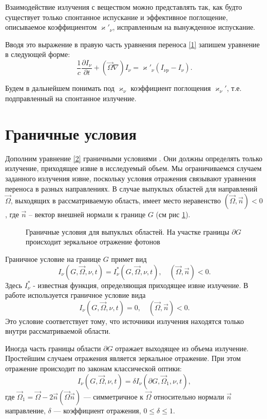 Взаимодействие излучения с веществом можно представлять так, как будто существует только спонтанное испускание и эффективное поглощение, описываемое коэффициентом $\varkappa'_{\nu}$, исправленным на вынужденное испускание. 

Вводя это выражение в правую часть уравнения переноса \eqref{1} запишем уравнение в следующей форме:
\begin {equation}
\frac{1}{c}\frac{\partial I_{\nu}}{\partial t} + (\vec\Omega \nabla) I_{\nu} = \varkappa'_{\nu} (I_{\nu p} - I_{\nu}).
\label{2}
\end {equation}

Будем в дальнейшем понимать под $\varkappa_\nu$ коэффициент поглощения $\varkappa_\nu'$, т.е. подправленный на спонтанное излучение.
\section {Граничные условия}
Дополним уравнение \eqref{2} граничными условиями \cite{chetv_1985}. Они должны определять только излучение, приходящее извне в исследуемый объем. Мы ограничиваемся случаем заданного излучения извне, поскольку условия отражения связывают уравнения переноса в разных направлениях. В случае выпуклых областей для направлений $\vec\Omega$, выходящих в рассматриваемую область, имеет место неравенство $(\vec\Omega, \vec n) < 0$, где $\vec n$ -- вектор внешней нормали к границе $G$ (см рис \ref{fig:6}).
\begin{figure}[ht!]
	\caption{Граничные условия для выпуклых областей. На участке границы $\partial G$ происходит зеркальное отражение фотонов}
	\label{fig:6}
\end{figure}

Граничное условие на границе $G$ примет вид
\begin {equation}
I_\nu (G, \vec\Omega, \nu, t) = I_\nu^*(G, \vec\Omega, \nu, t), \quad (\vec\Omega, \vec n) < 0.
\end {equation}
Здесь $I_\nu^*$ - известная функция, определяющая приходящее извне излучение. В работе используется граничное условие вида
\begin {equation}
I_\nu (G, \vec\Omega, \nu, t) = 0, \quad (\vec\Omega, \vec n) < 0.
\end {equation}
Это условие соответствует тому, что источники излучения находятся только внутри рассматриваемой области.

Иногда часть границы области $\partial G$ отражает выходящее из объема излучение. Простейшим случаем отражения является зеркальное отражение. При этом отражение происходит по законам классической оптики:
\begin {equation}
I_\nu (G, \vec\Omega, \nu, t) = \delta I_\nu(\partial G, \vec\Omega_1, \nu, t), 
\end {equation}
где $\vec\Omega_1 = \vec\Omega - 2\vec n( \vec\Omega\vec n)$ --- симметричное к $\vec\Omega$ относительно нормали $\vec n$ направление, $\delta$ --- коэффициент отражения, $0 \leqslant \delta \leqslant 1$.
